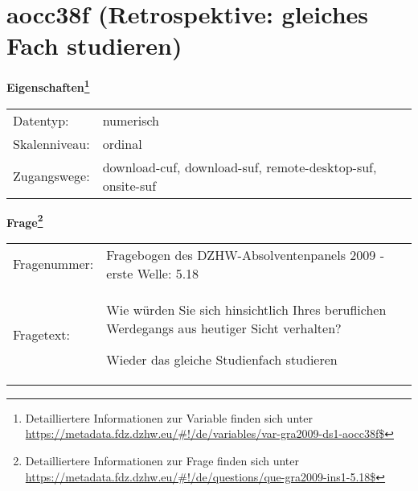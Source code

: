 
    \setcounter{footnote}{0}

    \vspace*{-1.8cm}
	\section{aocc38f (Retrospektive: gleiches Fach studieren)}
	\label{section:aocc38f}



    \vspace*{0.5cm}
    \noindent\textbf{Eigenschaften\footnote{Detailliertere Informationen zur Variable finden sich unter
		\url{https://metadata.fdz.dzhw.eu/\#!/de/variables/var-gra2009-ds1-aocc38f$}}}\\
	\begin{tabularx}{\hsize}{@{}lX}
	Datentyp: & numerisch \\
	Skalenniveau: & ordinal \\
	Zugangswege: &
	  download-cuf, 
	  download-suf, 
	  remote-desktop-suf, 
	  onsite-suf
 \\
    \end{tabularx}



				\vspace*{0.5cm}
                \noindent\textbf{Frage\footnote{Detailliertere Informationen zur Frage finden sich unter
		              \url{https://metadata.fdz.dzhw.eu/\#!/de/questions/que-gra2009-ins1-5.18$}}}\\
				\begin{tabularx}{\hsize}{@{}lX}
					Fragenummer: &
					  Fragebogen des DZHW-Absolventenpanels 2009 - erste Welle:
					  5.18
 \\
					Fragetext: & Wie würden Sie sich hinsichtlich Ihres beruflichen Werdegangs aus heutiger Sicht verhalten?\par  Wieder das gleiche Studienfach studieren \\
				\end{tabularx}





